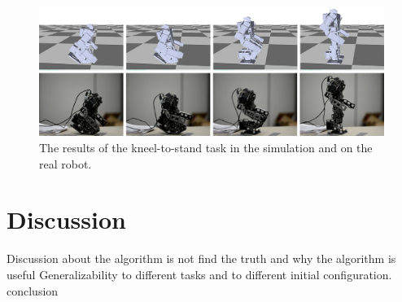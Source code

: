 \begin{figure}[!t]
  \centering
  \includegraphics[width=\textwidth]{figures/kneel2Stand}
  \caption{The results of the kneel-to-stand task in the simulation and on the real robot.}
  \label{fig:kneel2Stand}
\end{figure}

\section{Discussion}
Discussion about the algorithm is not find the truth and why the algorithm is useful 
Generalizability to different tasks and to different initial configuration.
conclusion 

